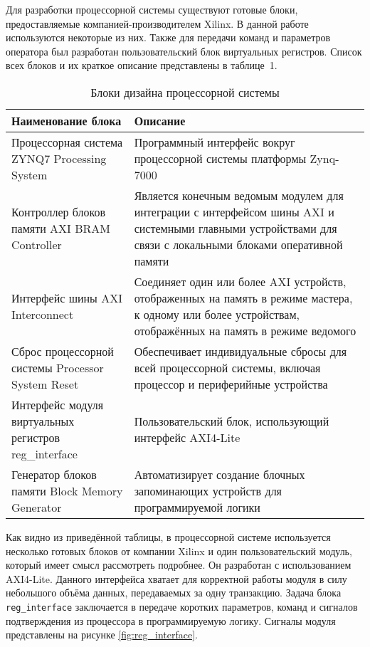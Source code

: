 Для разработки процессорной системы существуют готовые блоки, предоставляемые компанией-производителем Xilinx. В данной работе используются некоторые из них. Также для передачи команд и параметров оператора был разработан пользовательский блок виртуальных регистров. Список всех блоков и их краткое описание представлены в таблице~1.\par%
\begin{table}[ht]
    \label{tab:PS_blocks}
    \caption{Блоки дизайна процессорной системы}
    \begin{tabular}{|p{}|p{}|}
        \hline
        Наименование блока & Описание \\
        \hline
        Процессорная система ZYNQ7 Processing System \parencite{ZYNQPS} & Программный интерфейс вокруг процессорной системы платформы Zynq-7000 \\
        \hline
        Контроллер блоков памяти AXI BRAM Controller \parencite{AXIBRAMctrl} & Является конечным ведомым модулем для интеграции с интерфейсом шины AXI и системными главными устройствами для связи с локальными блоками оперативной памяти \\
        \hline
        Интерфейс шины AXI Interconnect \parencite{AXIInterconnect} & Соединяет один или более AXI устройств, отображенных на память в режиме мастера, к одному или более устройствам, отображённых на память в режиме ведомого \\
        \hline
        Сброс процессорной системы Processor System Reset \parencite{PSReset} & Обеспечивает индивидуальные сбросы для всей процессорной системы, включая процессор и периферийные устройства \\
        \hline
        Интерфейс модуля виртуальных регистров reg\_interface & Пользовательский блок, использующий интерфейс AXI4-Lite \\
        \hline
        Генератор блоков памяти Block Memory Generator \parencite{Blockmemgen} & Автоматизирует создание блочных запоминающих устройств для программируемой логики\\
        \hline
    \end{tabular}
\end{table}
Как видно из приведённой таблицы, в процессорной системе используется несколько готовых блоков от компании Xilinx и один пользовательский модуль, который имеет смысл рассмотреть подробнее. Он разработан с использованием AXI4-Lite. Данного интерфейса хватает для корректной работы модуля в силу небольшого объёма данных, передаваемых за одну транзакцию. Задача блока \texttt{reg\_interface} заключается в передаче коротких параметров, команд и сигналов подтверждения из процессора в программируемую логику. Сигналы модуля представлены на рисунке \ref{fig:reg_interface}.\par 
